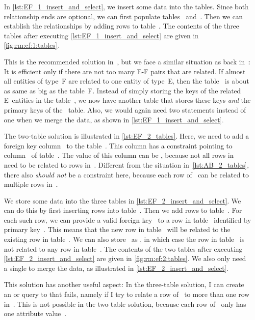 In \cref{lst:EF_1_insert_and_select}, we insert some data into the tables.
Since both relationship ends are optional, we can first populate tables~ and~.
Then we can establish the relationships by adding rows to table~.
The contents of the three tables after executing \cref{lst:EF_1_insert_and_select} are given in \cref{fig:rm:ef:1:tables}.%
%
\begin{sloppypar}%
This is the recommended solution in~\cite{S2024D:MEDTRDM}, but we face a similar situation as back in~:
It is efficient only if there are not too many E\nobreakdashes-F pairs that are related.
If almost all entities of type~F are related to one entity of type~E, then the table~ is about as same as big as the table~F.
Instead of simply storing the keys of the related E~entities in the table~, we now have another table that stores these keys \emph{and} the primary keys of the ~table.
Also, we would again need two  statements instead of one when we merge the data, as shown in \cref{lst:EF_1_insert_and_select}.%
\end{sloppypar}%
%
The two-table solution is illustrated in \cref{lst:EF_2_tables}.
Here, we need to add a foreign key column~ to the table~.
This column has a  constraint pointing to column~ of table~.
The value of this column can be , because not all rows in~ need to be related to rows in~.
Different from the  situation in~\cref{lst:AB_2_tables}, there also \emph{should not} be a  constraint here, because each row of~ can be related to multiple rows in~.

We store some data into the three tables in \cref{lst:EF_2_insert_and_select}.
We can do this by first inserting rows into table~.
Then we add rows to table~.
For each such row, we can provide a valid foreign key~ to a row in table~ identified by primary key~.
This means that the new row in table~ will be related to the existing row in table~.
We can also store~ as , in which case the row in table~ is not related to any row in table~.
The contents of the two tables after executing \cref{lst:EF_2_insert_and_select} are given in \cref{fig:rm:ef:2:tables}.
We also only need a single  to merge the data, as illustrated in \cref{lst:EF_2_insert_and_select}.

This solution has another useful aspect:
In the three-table solution, I can create an  or  query to  that fails, namely if I try to relate a row of~ to more than one row in~.
This is not possible in the two-table solution, because each row of~ only has one attribute value~.%
%
\FloatBarrier%
\endhsection%
%

